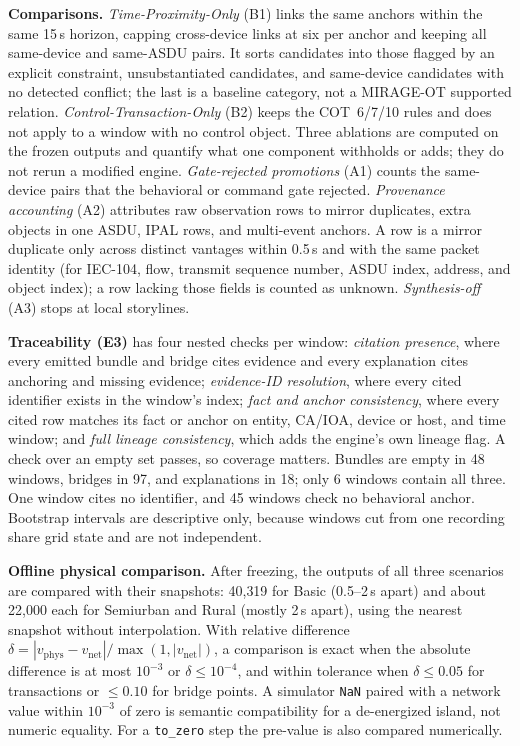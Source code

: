 \documentclass[conference]{IEEEtran}
\begin{document}
\textbf{Comparisons.}
\emph{Time-Proximity-Only} (B1) links the same anchors within the same 15\,s horizon, capping cross-device links at six per anchor and keeping all same-device and same-ASDU pairs.
It sorts candidates into those flagged by an explicit constraint, unsubstantiated candidates, and same-device candidates with no detected conflict; the last is a baseline category, not a MIRAGE-OT supported relation.
\emph{Control-Transaction-Only} (B2) keeps the COT~6/7/10 rules and does not apply to a window with no control object.
Three ablations are computed on the frozen outputs and quantify what one component withholds or adds; they do not rerun a modified engine.
\emph{Gate-rejected promotions} (A1) counts the same-device pairs that the behavioral or command gate rejected.
\emph{Provenance accounting} (A2) attributes raw observation rows to mirror duplicates, extra objects in one ASDU, IPAL rows, and multi-event anchors.
A row is a mirror duplicate only across distinct vantages within 0.5\,s and with the same packet identity (for IEC-104, flow, transmit sequence number, ASDU index, address, and object index); a row lacking those fields is counted as unknown.
\emph{Synthesis-off} (A3) stops at local storylines.

\textbf{Traceability (E3)} has four nested checks per window: \emph{citation presence}, where every emitted bundle and bridge cites evidence and every explanation cites anchoring and missing evidence; \emph{evidence-ID resolution}, where every cited identifier exists in the window's index; \emph{fact and anchor consistency}, where every cited row matches its fact or anchor on entity, CA/IOA, device or host, and time window; and \emph{full lineage consistency}, which adds the engine's own lineage flag.
A check over an empty set passes, so coverage matters.
Bundles are empty in 48 windows, bridges in 97, and explanations in 18; only 6 windows contain all three.
One window cites no identifier, and 45 windows check no behavioral anchor.
Bootstrap intervals are descriptive only, because windows cut from one recording share grid state and are not independent.

\textbf{Offline physical comparison.}
After freezing, the outputs of all three scenarios are compared with their snapshots: 40{,}319 for Basic (0.5--2\,s apart) and about 22{,}000 each for Semiurban and Rural (mostly 2\,s apart), using the nearest snapshot without interpolation.
With relative difference $\delta=|v_{\mathrm{phys}}-v_{\mathrm{net}}|/\max(1,|v_{\mathrm{net}}|)$, a comparison is exact when the absolute difference is at most $10^{-3}$ or $\delta\le 10^{-4}$, and within tolerance when $\delta\le 0.05$ for transactions or $\le 0.10$ for bridge points.
A simulator \texttt{NaN} paired with a network value within $10^{-3}$ of zero is semantic compatibility for a de-energized island, not numeric equality.
For a \texttt{to\_zero} step the pre-value is also compared numerically.
\end{document}
